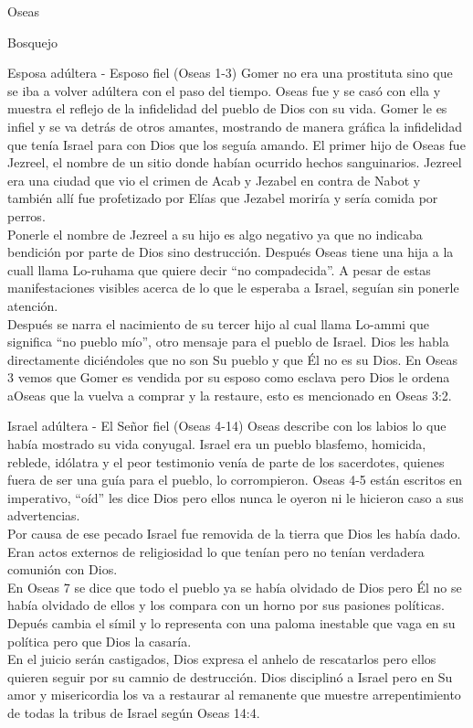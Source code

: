 \begin{section}{Oseas}
\begin{subsection}{Bosquejo}
\begin{subsubsection}{Esposa adúltera - Esposo fiel (Oseas 1-3)}
			Gomer no era una prostituta sino que se iba a volver adúltera con el paso del tiempo. Oseas fue y se casó con ella y muestra el reflejo de la infidelidad del pueblo de Dios con su vida. Gomer le es infiel y se va detrás de otros amantes, mostrando de manera gráfica la infidelidad que tenía Israel para con Dios que los seguía amando. El primer hijo de Oseas fue Jezreel, el nombre de un sitio donde habían ocurrido hechos sanguinarios. Jezreel era una ciudad que vio el crimen de Acab y Jezabel en contra de Nabot y también allí fue profetizado por Elías que Jezabel moriría y sería comida por perros.\\
			Ponerle el nombre de Jezreel a su hijo es algo negativo ya que no indicaba bendición por parte de Dios sino destrucción. Después Oseas tiene una hija a la cuall llama Lo-ruhama que quiere decir ``no compadecida''.
			\newpage
			A pesar de estas manifestaciones visibles acerca de lo que le esperaba a Israel, seguían sin ponerle atención. \\
			Después se narra el nacimiento de su tercer hijo al cual llama Lo-ammi que significa ``no pueblo mío'', otro mensaje para el pueblo de Israel. Dios les habla directamente diciéndoles que no son Su pueblo y que Él no es su Dios. En Oseas 3 vemos que Gomer es vendida por su esposo como esclava pero Dios le ordena aOseas que la vuelva a comprar y la restaure, esto es mencionado en Oseas 3:2.
		\end{subsubsection}
		\begin{subsubsection}{Israel adúltera - El Señor fiel (Oseas 4-14)}
			Oseas describe con los labios lo que había mostrado su vida conyugal. Israel era un pueblo blasfemo, homicida, reblede, idólatra y el peor testimonio venía de parte de los sacerdotes, quienes fuera de ser una guía para el pueblo, lo corrompieron. Oseas 4-5 están escritos en imperativo, ``oíd'' les dice Dios pero ellos nunca le oyeron ni le hicieron caso a sus advertencias.\\
			Por causa de ese pecado Israel fue removida de la tierra que Dios les había dado. Eran actos externos de religiosidad lo que tenían pero no tenían verdadera comunión con Dios.\\
			En Oseas 7 se dice que todo el pueblo ya se había olvidado de Dios pero Él no se había olvidado de ellos y los compara con un horno por sus pasiones políticas. Depués cambia el símil y lo representa con una paloma inestable que vaga en su política pero que Dios la casaría. \\
			En el juicio serán castigados, Dios expresa el anhelo de rescatarlos pero ellos quieren seguir por su camnio de destrucción. Dios disciplinó a Israel pero en Su amor y misericordia los va a restaurar al remanente que muestre arrepentimiento de todas la tribus de Israel según Oseas 14:4.\\
		\end{subsubsection}
	\end{subsection}
\end{section}
%


